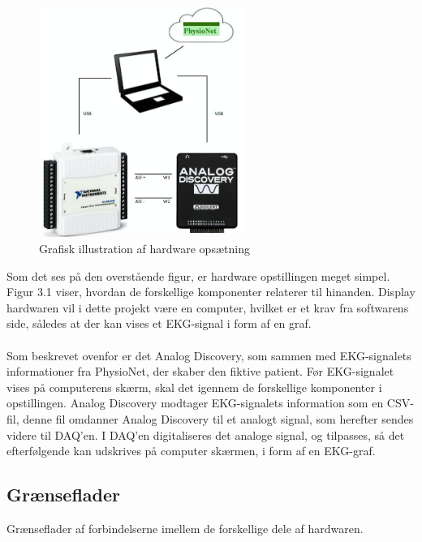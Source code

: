 \begin{figure}[H]
	\centering
	\includegraphics[width=0.6\textwidth]{Figurer/Snip20150427_1}
	\caption{Grafisk illustration af hardware opsætning}
\end{figure}

Som det ses på den overstående figur, er hardware opstillingen meget simpel. Figur 3.1 viser, hvordan de forskellige komponenter relaterer til hinanden. Display hardwaren vil i dette projekt være en computer, hvilket er et krav fra softwarens side, således at der kan vises et EKG-signal i form af en graf.
\\
\\  
Som beskrevet ovenfor er det Analog Discovery, som sammen med EKG-signalets informationer fra PhysioNet, der skaber den fiktive patient. Før EKG-signalet vises på computerens skærm, skal det igennem de forskellige komponenter i opstillingen. Analog Discovery modtager EKG-signalets  information som en CSV-fil, denne fil omdanner Analog Discovery til et analogt signal, som herefter sendes videre til DAQ’en. I DAQ’en digitaliseres det analoge signal, og tilpasses, så det efterfølgende kan udskrives på computer skærmen, i form af en EKG-graf. 

\subsection{Grænseflader}
Grænseflader af forbindelserne imellem de forskellige dele af hardwaren. 

